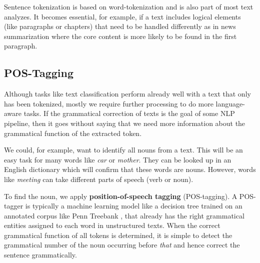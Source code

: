   Sentence tokenization is based on word-tokenization and is also part of most text analyzes.
  It becomes essential, for example, if a text includes logical elements (like paragraphs or chapters) that need to be handled differently as in news summarization where the core content is more likely to be found in the first paragraph.

\subsection{POS-Tagging}
  Although tasks like text classification perform already well with a text that only has been tokenized, mostly we require further processing to do more language-aware tasks.
  If the grammatical correction of texts is the goal of some NLP pipeline, then it goes without saying that we need more information about the grammatical function of the extracted token.

  We could, for example, want to identify all nouns from a text. This will be an easy task for many words like \textit{car} or \textit{mother}. They can be looked up in an English dictionary which will confirm that these words are nouns. However, words like \textit{meeting} can take different parts of speech (verb or noun).

  To find the noun, we apply \textbf{position-of-speech tagging} (\gls{POS-tagging}).
  A POS-tagger is typically a machine learning model like a decision tree \citep{Marquez98} trained on an annotated corpus like Penn Treebank \citep{PennTreebank}, that already has the right grammatical entities assigned to each word in unstructured texts.
  When the correct grammatical function of all tokens is determined, it is simple to detect the grammatical number of the noun occurring before \textit{that} and hence correct the sentence grammatically.

